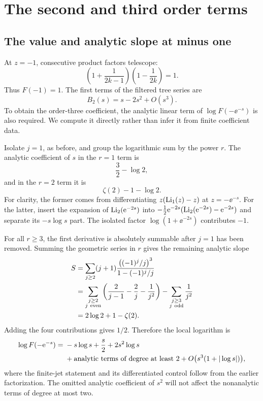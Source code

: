 \section{The second and third order terms}\label{cms:sec:explicit}
\subsection{The value and analytic slope at minus one}
At $z=-1$, consecutive product factors telescope:
\begin{equation}\label{cms:eq:minusvalue}
\left(1+\frac1{2k-1}\right)
\left(1-\frac1{2k}\right)=1.
\end{equation}
Thus $F(-1)=1$. The first terms of the filtered tree series are
\begin{equation}\label{cms:eq:B2}
B_2(s)=s-2s^2+O(s^3).
\end{equation}
To obtain the order-three coefficient, the analytic linear term of $\log F(-\ee^{-s})$ is also required. We compute it directly rather than infer it from finite coefficient data.

Isolate $j=1$, as before, and group the logarithmic sum by the power $r$. The analytic coefficient of $s$ in the $r=1$ term is
\[
\frac32-\log2,
\]
and in the $r=2$ term it is
\[
\zeta(2)-1-\log2.
\]
For clarity, the former comes from differentiating $z(\operatorname{Li}_1(z)-z)$ at $z=-\ee^{-s}$. For the latter, insert the expansion of $\operatorname{Li}_2(\mathrm e^{-2s})$ into $-\tfrac12\mathrm e^{-2s}(\operatorname{Li}_2(\mathrm e^{-2s})-\mathrm e^{-2s})$ and separate its $-s\log s$ part. The isolated factor $\log(1+\ee^{-2s})$ contributes $-1$.

For all $r\geq3$, the first derivative is absolutely summable after $j=1$ has been removed. Summing the geometric series in $r$ gives the remaining analytic slope
\begin{align}\label{cms:eq:slopeS}
S&=\sum_{j\geq2}(j+1)
\frac{\bigl((-1)^j/j\bigr)^3}{1-(-1)^j/j}\\
&=\sum_{\substack{j\geq2\\j\ \mathrm{even}}}
\left(\frac2{j-1}-\frac2j-\frac1{j^2}\right)
-\sum_{\substack{j\geq3\\j\ \mathrm{odd}}}\frac1{j^2}\notag\\
&=2\log2+1-\zeta(2).\notag
\end{align}
Adding the four contributions gives $1/2$. Therefore the local logarithm is
\begin{align}\label{cms:eq:logminus}
\log F(-\mathrm e^{-s})={}&-s\log s+\frac{s}{2}+2s^2\log s\\
&+\text{analytic terms of degree at least }2
+O\bigl(s^3(1+|\log s|)\bigr),\notag
\end{align}
where the finite-jet statement and its differentiated control follow from the earlier factorization. The omitted analytic coefficient of $s^2$ will not affect the nonanalytic terms of degree at most two.

